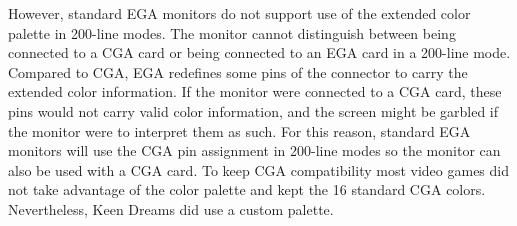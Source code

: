 \documentclass[book.tex]{subfiles}
\begin{document}
However, standard EGA monitors do not support use of the extended color palette in 200-line modes. The monitor cannot distinguish between being connected to a CGA card or being connected to an EGA card in a 200-line mode. Compared to CGA, EGA redefines some pins of the connector to carry the extended color information. If the monitor were connected to a CGA card, these pins would not carry valid color information, and the screen might be garbled if the monitor were to interpret them as such. For this reason, standard EGA monitors will use the CGA pin assignment in 200-line modes so the monitor can also be used with a CGA card. To keep  CGA compatibility most video games did not take advantage of the color palette and kept the 16 standard CGA colors. Nevertheless, Keen Dreams did  use a custom palette.\\
\end{document}
